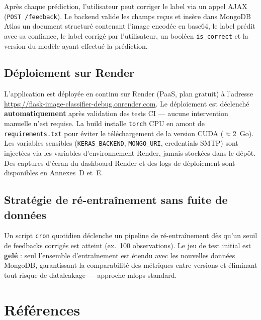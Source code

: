 \documentclass[french, a4paper, 12pt]{article}
\begin{document}
Après chaque prédiction, l'utilisateur peut corriger le label via un appel
AJAX (\texttt{POST /feedback}). Le backend valide les champs reçus et insère
dans MongoDB Atlas un document structuré contenant l'image encodée en base64,
le label prédit avec sa confiance, le label corrigé par l'utilisateur,
un booléen \texttt{is\_correct} et la version du modèle ayant effectué
la prédiction.

\subsection{Déploiement sur Render}

L'application est déployée en continu sur Render (PaaS, plan gratuit) à l'adresse
\url{https://flask-image-classifier-debug.onrender.com}. Le déploiement est déclenché
\textbf{automatiquement} après validation des tests CI — aucune intervention manuelle
n'est requise. La build installe \texttt{torch} CPU en amont de \texttt{requirements.txt}
pour éviter le téléchargement de la version CUDA ($\approx$2~Go). Les variables sensibles
(\texttt{KERAS\_BACKEND}, \texttt{MONGO\_URI}, credentials SMTP) sont injectées via les
variables d'environnement Render, jamais stockées dans le dépôt. Des captures d'écran
du dashboard Render et des logs de déploiement sont disponibles en Annexes~D et~E.

\subsection{Stratégie de ré-entraînement sans fuite de données}

Un script \texttt{cron} quotidien déclenche un pipeline de ré-entraînement dès qu'un
seuil de feedbacks corrigés est atteint (ex.\ 100 observations). Le jeu de test initial
est \textbf{gelé} : seul l'ensemble d'entraînement est étendu avec les nouvelles données
MongoDB, garantissant la comparabilité des métriques entre versions et éliminant tout
risque de \gls{dataleakage} — approche \gls{mlops} standard.

\newpage

\section*{Références}
\printbibliography[heading=none]
\end{document}
